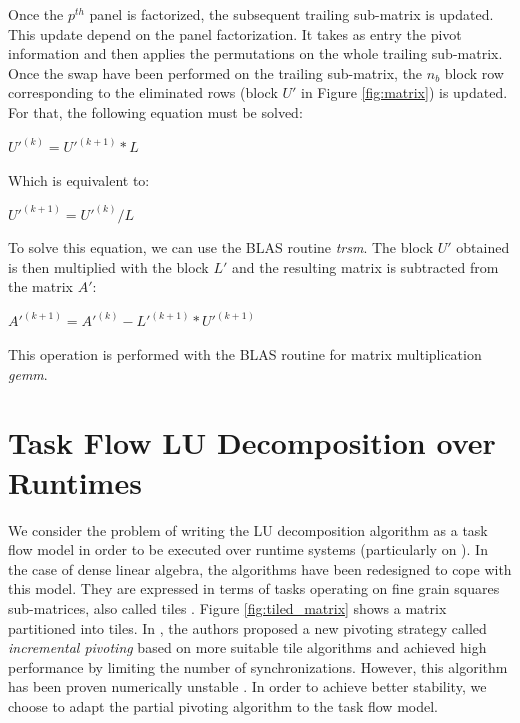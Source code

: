 Once the $p^{th}$ panel is factorized, the subsequent trailing sub-matrix is updated. This update depend on the panel factorization. It takes as entry the pivot information and then applies the permutations on the whole trailing sub-matrix. Once the swap have been performed on the trailing sub-matrix, the $n_b$ block row corresponding to the eliminated rows (block $U'$ in Figure \ref{fig:matrix}) is updated. For that, the following equation must be solved:
\begin{center}
$U'^{(k)} = U'^{(k+1)}*L$
\end{center}
Which is equivalent to:
\begin{center}
$U'^{(k+1)} = U'^{(k)} / L$
\end{center}
To solve this equation, we can use the BLAS routine \textit{trsm}. The block $U'$ obtained is then multiplied with the block $L'$ and the resulting matrix is subtracted from the matrix $A'$:
\begin{center}
$A'^{(k+1)} = A'^{(k)} - L'^{(k+1)}*U'^{(k+1)}$
\end{center}
This operation is performed with the BLAS routine for matrix multiplication \textit{gemm}.


\section{Task Flow LU Decomposition over Runtimes \label{task_flow_lu}}
We consider the problem of writing the LU decomposition algorithm as a task flow model in order to be executed over runtime systems (particularly on \dague). In the case of dense linear algebra, the algorithms have been redesigned to cope with this model. They are expressed in terms of tasks operating on fine grain squares sub-matrices, also called tiles \cite{conf/para/ButtariDKLLT06,ChanEtAl07b}. Figure \ref{fig:tiled_matrix} shows a matrix partitioned into tiles. In \cite{Buttari09}, the authors proposed a new pivoting strategy called \emph{incremental pivoting} based on \cite{Quintana-Orti:2009:ULF} more suitable tile algorithms and achieved high performance by limiting the number of synchronizations. However, this algorithm has been proven numerically unstable \cite{journals/siammax/GrigoriDX11}. In order to achieve better stability, we choose to adapt the partial pivoting algorithm to the task flow model.

